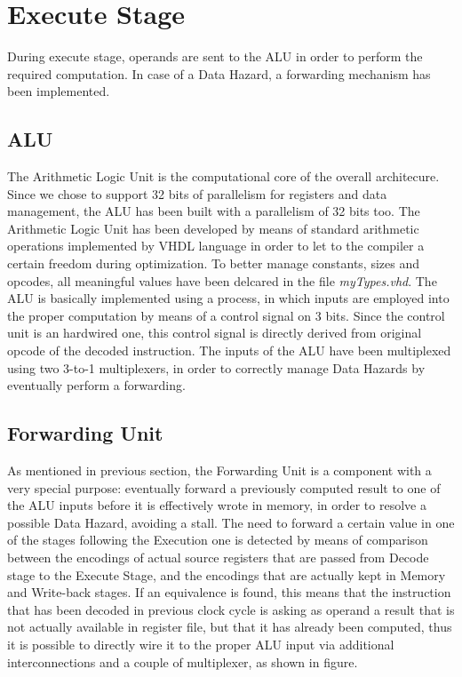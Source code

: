 \section{Execute Stage}
During execute stage, operands are sent to the ALU in order to perform the required computation. 
In case of a Data Hazard, a forwarding mechanism has been implemented.
\subsection{ALU}

The Arithmetic Logic Unit is the computational core of the overall architecure.
Since we chose to support 32 bits of parallelism for registers and data management, the ALU has been built with a parallelism of 32 bits too.
The Arithmetic Logic Unit has been developed by means of standard arithmetic operations implemented by VHDL language in order to let to the compiler a certain freedom during optimization.
To better manage constants, sizes and opcodes, all meaningful values have been delcared in the file \textit{myTypes.vhd}.
The ALU is basically implemented using a process, in which inputs are employed into the proper computation by means of a control signal on 3 bits.
Since the control unit is an hardwired one, this control signal is directly derived from original opcode of the decoded instruction.
The inputs of the ALU have been multiplexed using two 3-to-1 multiplexers, in order to correctly manage Data Hazards by eventually perform a forwarding.
\subsection{Forwarding Unit}
As mentioned in previous section, the Forwarding Unit is a component with a very special purpose: eventually forward a previously computed result to one of the ALU inputs before it is effectively wrote in memory, in order to resolve a possible Data Hazard, avoiding a stall.
The need to forward a certain value in one of the stages following the Execution one is detected by means of comparison between the encodings of actual source registers that are passed from Decode stage to the Execute Stage, and the encodings that are actually kept in Memory and Write-back stages.
If an equivalence is found, this means that the instruction that has been decoded in previous clock cycle is asking as operand a result that is not actually available in register file, but that it has already been computed, thus it is possible to directly wire it to the proper ALU input via additional interconnections and a couple of multiplexer, as shown in figure.  
